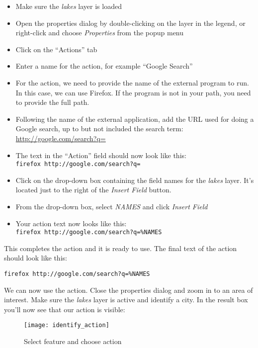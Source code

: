 \begin{itemize}
\item Make sure the \textsl{lakes} layer is loaded
\item Open the properties dialog by double-clicking on the layer in the
  legend, or right-click and choose \textsl{Properties} from the popup menu
\item Click on the ``Actions'' tab
\item Enter a name for the action, for example ``Google Search''
\item For the action, we need to provide the name of the external program to
  run. In this case, we can use Firefox. If the program is not in
  your path, you need to provide the full path.
\item Following the name of the external application, add the URL used for
  doing a Google search, up to but not included the search term:
  \url{http://google.com/search?q=}
\item The text in the ``Action'' field should now look like this:\\
  \texttt{firefox http://google.com/search?q=}
\item Click on the drop-down box containing the field names for the
  \textsl{lakes} layer. It's located just to the right of the
  \textsl{Insert Field} button.
\item From the drop-down box, select \textsl{NAMES} and click \textsl{Insert Field}
\item Your action text now looks like this:\\ \texttt{firefox
  http://google.com/search?q=\%NAMES}
\end{itemize}
 
This completes the action and it is ready to use. The final text of the action
should look like this:

\begin{center}
\texttt{firefox http://google.com/search?q=\%NAMES}
\end{center}

We can now use the action. Close the properties dialog and zoom in to an area
of interest. Make sure the \textsl{lakes} layer is active and identify a
city. In the result box you'll now see that our action is visible:

\begin{figure}[H]
   \begin{center}
   \caption{Select feature and choose action}\label{fig:identify_action}\smallskip
   \texttt{[image: identify\_action]} 
\end{center}  
\end{figure}

